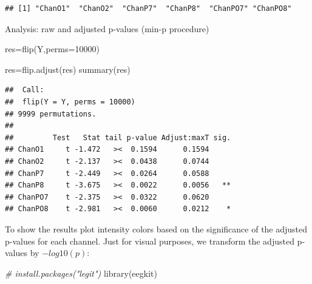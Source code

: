 \documentclass[
]{article}
\newenvironment{Shaded}{\begin{snugshade}}{\end{snugshade}}
\newcommand{\AttributeTok}[1]{\textcolor[rgb]{0.77,0.63,0.00}{#1}}
\newcommand{\CommentTok}[1]{\textcolor[rgb]{0.56,0.35,0.01}{\textit{#1}}}
\newcommand{\DecValTok}[1]{\textcolor[rgb]{0.00,0.00,0.81}{#1}}
\newcommand{\FunctionTok}[1]{\textcolor[rgb]{0.00,0.00,0.00}{#1}}
\newcommand{\NormalTok}[1]{#1}
\newcommand{\OtherTok}[1]{\textcolor[rgb]{0.56,0.35,0.01}{#1}}
\newcommand{\SpecialCharTok}[1]{\textcolor[rgb]{0.00,0.00,0.00}{#1}}
\newcommand{\StringTok}[1]{\textcolor[rgb]{0.31,0.60,0.02}{#1}}
\begin{document}
\begin{Shaded}
\end{Shaded}

\begin{verbatim}
## [1] "ChanO1"  "ChanO2"  "ChanP7"  "ChanP8"  "ChanPO7" "ChanPO8"
\end{verbatim}

Analysis: raw and adjusted p-values (min-p procedure)

\begin{Shaded}
\begin{Highlighting}[]
\NormalTok{res}\OtherTok{=}\FunctionTok{flip}\NormalTok{(Y,}\AttributeTok{perms=}\DecValTok{10000}\NormalTok{)}

\NormalTok{res}\OtherTok{=}\FunctionTok{flip.adjust}\NormalTok{(res)}
\FunctionTok{summary}\NormalTok{(res)}
\end{Highlighting}
\end{Shaded}

\begin{verbatim}
##  Call:
##  flip(Y = Y, perms = 10000) 
## 9999 permutations.
## 
##         Test   Stat tail p-value Adjust:maxT sig.
## ChanO1     t -1.472   ><  0.1594      0.1594     
## ChanO2     t -2.137   ><  0.0438      0.0744     
## ChanP7     t -2.449   ><  0.0264      0.0588     
## ChanP8     t -3.675   ><  0.0022      0.0056   **
## ChanPO7    t -2.375   ><  0.0322      0.0620     
## ChanPO8    t -2.981   ><  0.0060      0.0212    *
\end{verbatim}

To show the results plot intensity colors based on the significance of
the adjusted p-values for each channel. Just for visual purposes, we
transform the adjusted p-values by \(-log10(p)\):

\begin{Shaded}
\begin{Highlighting}[]
\CommentTok{\# install.packages("legit")}
\FunctionTok{library}\NormalTok{(eegkit)}
\end{Highlighting}
\end{Shaded}
\end{document}
